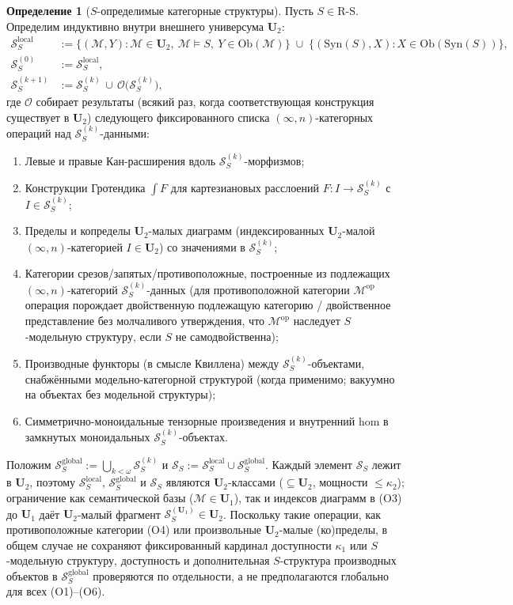 \documentclass[11pt]{article}
\theoremstyle{plain}
\theoremstyle{definition}
\newtheorem{definition}[theorem]{Определение}
\newcommand{\RS}{\mathrm{R\text{-}S}}
\newcommand{\cS}{\mathcal{S}}
\newcommand{\cM}{\mathcal{M}}
\newcommand{\Ob}{\mathrm{Ob}}
\newcommand{\Syn}{\mathrm{Syn}}
\begin{document}
\begin{definition}[$S$-определимые категорные структуры]\label{def:SS}
Пусть $S \in \RS$. Определим индуктивно внутри внешнего универсума $\mathbf{U}_2$:
\begin{align*}
\cS_S^{\mathrm{local}} &:= \{(\cM, Y) : \cM \in \mathbf{U}_2,\ \cM \models S,\ Y \in \Ob(\cM)\} \;\cup\; \{(\Syn(S), X) : X \in \Ob(\Syn(S))\}, \\
\cS_S^{(0)} &:= \cS_S^{\mathrm{local}}, \\
\cS_S^{(k+1)} &:= \cS_S^{(k)} \,\cup\, \mathcal{O}\bigl(\cS_S^{(k)}\bigr),
\end{align*}
где $\mathcal{O}$ собирает результаты (всякий раз, когда соответствующая конструкция существует в $\mathbf{U}_2$) следующего фиксированного списка $(\infty, n)$-категорных операций над $\cS_S^{(k)}$-данными:
\begin{enumerate}[nosep,label=\textrm{(O\arabic*)}]
\item Левые и правые Кан-расширения вдоль $\cS_S^{(k)}$-морфизмов;
\item Конструкции Гротендика $\int F$ для картезиановых расслоений $F : I \to \cS_S^{(k)}$ с $I \in \cS_S^{(k)}$;
\item Пределы и копределы $\mathbf{U}_2$-малых диаграмм (индексированных $\mathbf{U}_2$-малой $(\infty, n)$-категорией $I \in \mathbf{U}_2$) со значениями в $\cS_S^{(k)}$;
\item Категории срезов/запятых/противоположные, построенные из подлежащих $(\infty, n)$-категорий $\cS_S^{(k)}$-данных (для противоположной категории $\cM^{\mathrm{op}}$ операция порождает двойственную подлежащую категорию / двойственное представление без молчаливого утверждения, что $\cM^{\mathrm{op}}$ наследует $S$-модельную структуру, если $S$ не самодвойственна);
\item Производные функторы (в смысле Квиллена) между $\cS_S^{(k)}$-объектами, снабжёнными модельно-категорной структурой (когда применимо; вакуумно на объектах без модельной структуры);
\item Симметрично-моноидальные тензорные произведения и внутренний hom в замкнутых моноидальных $\cS_S^{(k)}$-объектах.
\end{enumerate}
Положим $\cS_S^{\mathrm{global}} := \bigcup_{k < \omega} \cS_S^{(k)}$ и $\cS_S := \cS_S^{\mathrm{local}} \cup \cS_S^{\mathrm{global}}$. Каждый элемент $\cS_S$ лежит в $\mathbf{U}_2$, поэтому $\cS_S^{\mathrm{local}}$, $\cS_S^{\mathrm{global}}$ и $\cS_S$ являются $\mathbf{U}_2$-классами ($\subseteq \mathbf{U}_2$, мощности $\le \kappa_2$); ограничение как семантической базы ($\cM \in \mathbf{U}_1$), так и индексов диаграмм в (O3) до $\mathbf{U}_1$ даёт $\mathbf{U}_2$-малый фрагмент $\cS_S^{(\mathbf{U}_1)} \in \mathbf{U}_2$. Поскольку такие операции, как противоположные категории (O4) или произвольные $\mathbf{U}_2$-малые (ко)пределы, в общем случае не сохраняют фиксированный кардинал доступности $\kappa_1$ или $S$-модельную структуру, доступность и дополнительная $S$-структура производных объектов в $\cS_S^{\mathrm{global}}$ проверяются по отдельности, а не предполагаются глобально для всех (O1)--(O6).
\end{definition}
\end{document}
